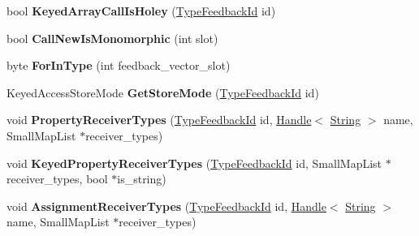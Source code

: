 \begin{DoxyCompactItemize}
\item 
\hypertarget{classv8_1_1internal_1_1_type_feedback_oracle_a9e775881a7429e8f6fc4e1d0ff679724}{}bool {\bfseries Keyed\+Array\+Call\+Is\+Holey} (\hyperlink{classv8_1_1internal_1_1_type_feedback_id}{Type\+Feedback\+Id} id)\label{classv8_1_1internal_1_1_type_feedback_oracle_a9e775881a7429e8f6fc4e1d0ff679724}

\item 
\hypertarget{classv8_1_1internal_1_1_type_feedback_oracle_aad33b278f034584ec40d9c07a957f6fc}{}bool {\bfseries Call\+New\+Is\+Monomorphic} (int slot)\label{classv8_1_1internal_1_1_type_feedback_oracle_aad33b278f034584ec40d9c07a957f6fc}

\item 
\hypertarget{classv8_1_1internal_1_1_type_feedback_oracle_a9449aa08a858b2a0fcd147523bfff821}{}byte {\bfseries For\+In\+Type} (int feedback\+\_\+vector\+\_\+slot)\label{classv8_1_1internal_1_1_type_feedback_oracle_a9449aa08a858b2a0fcd147523bfff821}

\item 
\hypertarget{classv8_1_1internal_1_1_type_feedback_oracle_a37d2af00a6a89572307774bcfe0c1bff}{}Keyed\+Access\+Store\+Mode {\bfseries Get\+Store\+Mode} (\hyperlink{classv8_1_1internal_1_1_type_feedback_id}{Type\+Feedback\+Id} id)\label{classv8_1_1internal_1_1_type_feedback_oracle_a37d2af00a6a89572307774bcfe0c1bff}

\item 
\hypertarget{classv8_1_1internal_1_1_type_feedback_oracle_ab2e2104c675f85af95445d6efc9c6c34}{}void {\bfseries Property\+Receiver\+Types} (\hyperlink{classv8_1_1internal_1_1_type_feedback_id}{Type\+Feedback\+Id} id, \hyperlink{classv8_1_1internal_1_1_handle}{Handle}$<$ \hyperlink{classv8_1_1internal_1_1_string}{String} $>$ name, Small\+Map\+List $\ast$receiver\+\_\+types)\label{classv8_1_1internal_1_1_type_feedback_oracle_ab2e2104c675f85af95445d6efc9c6c34}

\item 
\hypertarget{classv8_1_1internal_1_1_type_feedback_oracle_a1c4743eef82d90df34445fe58bb7999b}{}void {\bfseries Keyed\+Property\+Receiver\+Types} (\hyperlink{classv8_1_1internal_1_1_type_feedback_id}{Type\+Feedback\+Id} id, Small\+Map\+List $\ast$receiver\+\_\+types, bool $\ast$is\+\_\+string)\label{classv8_1_1internal_1_1_type_feedback_oracle_a1c4743eef82d90df34445fe58bb7999b}

\item 
\hypertarget{classv8_1_1internal_1_1_type_feedback_oracle_aec0dabdd6de011fe6d2aa4b47107f709}{}void {\bfseries Assignment\+Receiver\+Types} (\hyperlink{classv8_1_1internal_1_1_type_feedback_id}{Type\+Feedback\+Id} id, \hyperlink{classv8_1_1internal_1_1_handle}{Handle}$<$ \hyperlink{classv8_1_1internal_1_1_string}{String} $>$ name, Small\+Map\+List $\ast$receiver\+\_\+types)\label{classv8_1_1internal_1_1_type_feedback_oracle_aec0dabdd6de011fe6d2aa4b47107f709}


\end{DoxyCompactItemize}

